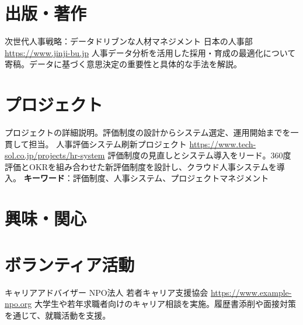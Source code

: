 \documentclass[a4paper, serif, 10pt]{moderncv}
\begin{document}
\section{出版・著作}

        {次世代人事戦略：データドリブンな人材マネジメント}
        {日本の人事部}
        {\url{https://www.jinji-bu.jp}}
        {}
        {人事データ分析を活用した採用・育成の最適化について寄稿。データに基づく意思決定の重要性と具体的な手法を解説。}
\section{プロジェクト}

        {プロジェクトの詳細説明。評価制度の設計からシステム選定、運用開始までを一貫して担当。}
        {人事評価システム刷新プロジェクト}
        {\url{https://www.tech-sol.co.jp/projects/hr-system}}
        {}
        {評価制度の見直しとシステム導入をリード。360度評価とOKRを組み合わせた新評価制度を設計し、クラウド人事システムを導入。
\textbf{キーワード}：評価制度、人事システム、プロジェクトマネジメント}
\section{興味・関心}

\section{ボランティア活動}

        {キャリアアドバイザー}
        {NPO法人 若者キャリア支援協会}
        {\url{https://www.example-npo.org}}
        {}
        {大学生や若年求職者向けのキャリア相談を実施。履歴書添削や面接対策を通じて、就職活動を支援。}
    
\end{document}
